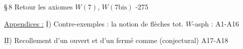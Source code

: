 \S\,8 Retour  les axiomes $W(7)$, $W(7\mathrm{bis})$ -275

\uline{Appendices :} $\overline{\underline{\mathrm{I}}}$) Contre-exemples  : la notion de flèches tot. $W$-asph : \hfill A1-A16


$\overline{\underline{\mathrm{II}}}$) Recollement d'un ouvert et d'un fermé comme    (conjectural) \hfill A17-A18

